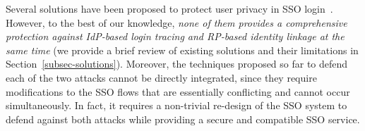 
Several solutions have been proposed to protect user privacy in SSO login~\cite{maler2008venn,NIST2017draft,BrowserID,SPRESSO}. However, to the best of our knowledge, {\em none of them provides a comprehensive protection against IdP-based login tracing and RP-based identity linkage at the same time} (we provide a brief review of existing solutions and their limitations in Section~\ref{subsec-solutions}). Moreover, the techniques proposed so far to defend each of the two attacks cannot be directly integrated, since they require modifications to the SSO flows that are essentially conflicting and cannot occur simultaneously. In fact, it requires a non-trivial re-design of the SSO system to defend against both attacks 
while providing a secure and compatible SSO service. 


